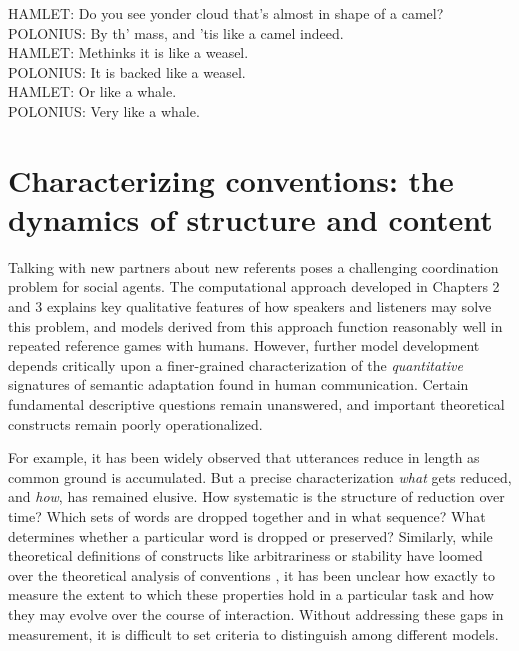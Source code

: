 \begin{savequote}[75mm]
HAMLET: Do you see yonder cloud that’s almost in shape of a camel?\\
POLONIUS: By th' mass, and ’tis like a camel indeed.\\
HAMLET: Methinks it is like a weasel.\\
POLONIUS: It is backed like a weasel.\\
HAMLET: Or like a whale.\\
POLONIUS: Very like a whale.\\
\end{savequote}


\chapter{Characterizing conventions: the dynamics of structure and content}
\graphicspath{{./figures/tangrams/}}

Talking with new partners about new referents poses a challenging coordination problem for social agents. 
The computational approach developed in Chapters 2 and 3 explains key qualitative features of how speakers and listeners may solve this problem, and models derived from this approach function reasonably well in repeated reference games with humans. 
However, further model development depends critically upon a finer-grained characterization of the \emph{quantitative} signatures of semantic adaptation found in human communication. 
Certain fundamental descriptive questions remain unanswered, and important theoretical constructs remain poorly operationalized. 

For example, it has been widely observed that utterances reduce in length as common ground is accumulated.
But a precise characterization \emph{what} gets reduced, and \emph{how}, has remained elusive.
How systematic is the structure of reduction over time?
Which sets of words are dropped together and in what sequence?
What determines whether a particular word is dropped or preserved? 
Similarly, while theoretical definitions of constructs like arbitrariness or stability have loomed over the theoretical analysis of conventions \cite{Lewis69_Convention}, it has been unclear how exactly to measure the extent to which these properties hold in a particular task and how they may evolve over the course of interaction. 
Without addressing these gaps in measurement, it is difficult to set criteria to distinguish among different models.

